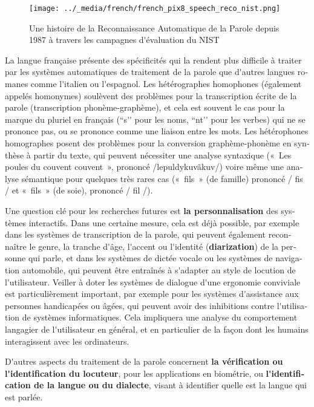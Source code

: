 \begin{french}
\begin{multicols}{2}
\begin{figure}[!ht]
\begin{center}
  \texttt{[image: ../\_media/french/french\_pix8\_speech\_reco\_nist.png]}
  \caption{Une histoire de la Reconnaissance Automatique de la Parole depuis 1987 à travers les campagnes d{\mbox '}évaluation du NIST~\cite{speechreconist}}
  \label{fig:nistreco}
\end{center}
\end{figure}

La langue française présente des spécificités qui la rendent plus
difficile à traiter par les systèmes automatiques de traitement de la
parole que d{\mbox '}autres langues romanes comme l{\mbox '}italien ou l{\mbox '}espagnol. Les
hétérographes homophones (également appelés homonymes) soulèvent des
problèmes pour la transcription écrite de la parole (transcription
phonème-graphème), et cela est souvent le cas pour la marque du
pluriel en français (``s{\mbox '}{\mbox '} pour les noms, ``nt{\mbox '}{\mbox '} pour les verbes) qui
ne se prononce pas, ou se prononce comme une liaison entre les
mots. Les hétérophones homographes posent des problèmes pour la
conversion graphème-phonème en synthèse à partir du texte, qui peuvent
nécessiter une analyse syntaxique («~Les poules du couvent couvent~»,
prononcé /lepuldykuvãkuv/) voire même une analyse sémantique pour
quelques très rares cas («~fils~» (de famille) prononcé / fis / et
«~fils~» (de soie), prononcé / fil /).

Une question clé pour les recherches futures est {\bf la personnalisation}
des systèmes interactifs. Dans une certaine mesure, cela est déjà
possible, par exemple dans les systèmes de transcription de la parole,
qui peuvent également reconnaître le genre, la tranche d{\mbox '}âge, l{\mbox '}accent
ou l{\mbox '}identité ({\bf diarization}) de la personne qui parle, et dans les
systèmes de dictée vocale ou les systèmes de navigation automobile,
qui peuvent être entraînés à s{\mbox '}adapter au style de locution de
l{\mbox '}utilisateur. Veiller à doter les systèmes de dialogue d{\mbox '}une ergonomie
conviviale est particulièrement important, par exemple pour les systèmes
d{\mbox '}assistance aux personnes handicapées ou âgées, qui peuvent avoir des
inhibitions contre l{\mbox '}utilisation de systèmes informatiques. Cela
impliquera une analyse du comportement langagier de l{\mbox '}utilisateur en
général, et en particulier de la façon dont les humains interagissent
avec les ordinateurs.

D{\mbox '}autres aspects du traitement de la parole concernent {\bf la vérification
ou l{\mbox '}identification du locuteur}, pour les applications en biométrie,
ou {\bf l{\mbox '}identification de la langue ou du dialecte}, visant à identifier
quelle est la langue qui est parlée.


\end{multicols}
\end{french}
